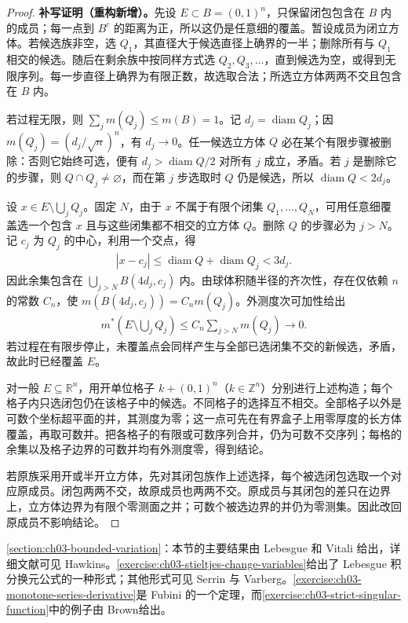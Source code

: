 \documentclass[../../main.tex]{subfiles}%
\begin{document}
\begin{proof}
\textbf{补写证明（重构新增）。}先设 $E\subset B=(0,1)^n$，只保留闭包包含在 $B$ 内的成员；每一点到 $B^c$ 的距离为正，所以这仍是任意细的覆盖。暂设成员为闭立方体。若候选族非空，选 $Q_1$，其直径大于候选直径上确界的一半；删除所有与 $Q_1$ 相交的候选。随后在剩余族中按同样方式选 $Q_2,Q_3,\ldots$，直到候选为空，或得到无限序列。每一步直径上确界为有限正数，故选取合法；所选立方体两两不交且包含在 $B$ 内。

若过程无限，则 $\sum_jm(Q_j)\le m(B)=1$。记 $d_j=\operatorname{diam}Q_j$；因 $m(Q_j)=(d_j/\sqrt n)^n$，有 $d_j\to0$。任一候选立方体 $Q$ 必在某个有限步骤被删除：否则它始终可选，便有 $d_j>\operatorname{diam}Q/2$ 对所有 $j$ 成立，矛盾。若 $j$ 是删除它的步骤，则 $Q\cap Q_j\ne\varnothing$，而在第 $j$ 步选取时 $Q$ 仍是候选，所以 $\operatorname{diam}Q<2d_j$。

设 $x\in E\setminus\bigcup_jQ_j$。固定 $N$，由于 $x$ 不属于有限个闭集 $Q_1,\ldots,Q_N$，可用任意细覆盖选一个包含 $x$ 且与这些闭集都不相交的立方体 $Q$。删除 $Q$ 的步骤必为 $j>N$。记 $c_j$ 为 $Q_j$ 的中心，利用一个交点，得
\begin{align*}
|x-c_j|\le\operatorname{diam}Q+\operatorname{diam}Q_j<3d_j.
\end{align*}
因此余集包含在 $\bigcup_{j>N}B(4d_j,c_j)$ 内。由球体积随半径的齐次性，存在仅依赖 $n$ 的常数 $C_n$，使 $m(B(4d_j,c_j))=C_nm(Q_j)$。外测度次可加性给出
\begin{align*}
m^*\left(E\setminus\bigcup_jQ_j\right)
\le C_n\sum_{j>N}m(Q_j)\longrightarrow0.
\end{align*}
若过程在有限步停止，未覆盖点会同样产生与全部已选闭集不交的新候选，矛盾，故此时已经覆盖 $E$。

对一般 $E\subseteq\mathbb R^n$，用开单位格子 $k+(0,1)^n$（$k\in\mathbb Z^n$）分别进行上述构造；每个格子内只选闭包仍在该格子中的候选。不同格子的选择互不相交。全部格子以外是可数个坐标超平面的并，其测度为零；这一点可先在有界盒子上用零厚度的长方体覆盖，再取可数并。把各格子的有限或可数序列合并，仍为可数不交序列；每格的余集以及格子边界的可数并均有外测度零，得到结论。

若原族采用开或半开立方体，先对其闭包族作上述选择，每个被选闭包选取一个对应原成员。闭包两两不交，故原成员也两两不交。原成员与其闭包的差只在边界上，立方体边界为有限个零测面之并；可数个被选边界的并仍为零测集。因此改回原成员不影响结论。
\end{proof}

\cref{section:ch03-bounded-variation}：本节的主要结果由 Lebesgue 和 Vitali 给出，详细文献可见 Hawkins\cite{folland-bib-070}。\cref{exercise:ch03-stieltjes-change-variables}给出了 Lebesgue 积分换元公式的一种形式；其他形式可见 Serrin 与 Varberg\cite{folland-bib-133}。\cref{exercise:ch03-monotone-series-derivative}是 Fubini 的一个定理，而\cref{exercise:ch03-strict-singular-function}中的例子由 Brown\cite{folland-bib-021}给出。
\end{document}
